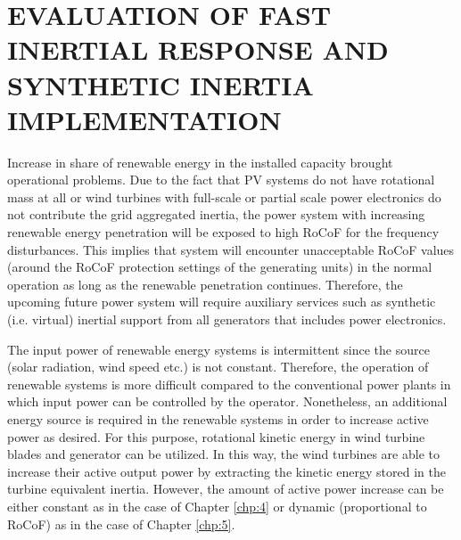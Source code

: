 \chapter{EVALUATION OF FAST INERTIAL RESPONSE AND SYNTHETIC INERTIA IMPLEMENTATION}
\label{chp:6}
Increase in share of renewable energy in the installed capacity brought operational problems. Due to the fact that PV systems do not have rotational mass at all or wind turbines with full-scale or partial scale power electronics do not contribute the grid aggregated inertia, the power system with increasing renewable energy penetration will be exposed to high RoCoF for the frequency disturbances. This implies that system will encounter unacceptable RoCoF values (around the RoCoF protection settings of the generating units) in the normal operation as long as the renewable penetration continues. Therefore, the upcoming future power system will require auxiliary services such as synthetic (i.e. virtual) inertial support from all generators that includes power electronics. \par
The input power of renewable energy systems is intermittent since the source (solar radiation, wind speed etc.) is not constant. Therefore, the operation of renewable systems is more difficult compared to the conventional power plants in which input power can be controlled by the operator. Nonetheless, an additional energy source is required in the renewable systems in order to increase active power as desired. For this purpose, rotational kinetic energy in wind turbine blades and generator can be utilized. In this way, the wind turbines are able to increase their active output power by extracting the kinetic energy stored in the turbine equivalent inertia. However, the amount of active power increase can be either constant as in the case of Chapter \ref{chp:4} or dynamic (proportional to RoCoF) as in the case of Chapter \ref{chp:5}.
